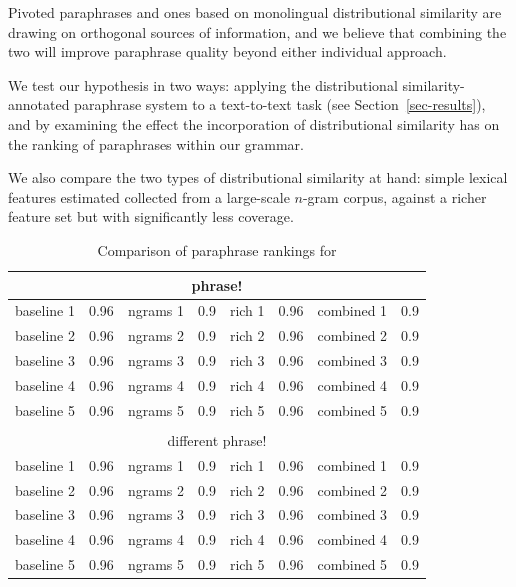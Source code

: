 \documentclass[11pt]{article}
\begin{document}
Pivoted paraphrases and ones based on monolingual distributional
similarity are drawing on orthogonal sources of information, and we
believe that combining the two will improve paraphrase quality beyond
either individual approach.

We test our hypothesis in two ways: applying the distributional
similarity-annotated paraphrase system to a text-to-text task (see
Section~\ref{sec-results}), and by examining the effect the
incorporation of distributional similarity has on the ranking of
paraphrases within our grammar.

We also compare the two types of distributional similarity at hand:
simple lexical features estimated collected from a large-scale
$n$-gram corpus, against a richer feature set but with significantly
less coverage.

\begin{table}[t]
\small
\begin{center}
\begin{tabular}{|cl|cl|cl|cl|}
  \hline
  \multicolumn{8}{|c|}{phrase!} \\
  \hline
  baseline 1 & 0.96 &
  ngrams 1 & 0.9 &
  rich 1 & 0.96 &
  combined 1 & 0.9 \\

  baseline 2 & 0.96 &
  ngrams 2 & 0.9 &
  rich 2 & 0.96 &
  combined 2 & 0.9 \\

  baseline 3 & 0.96 &
  ngrams 3 & 0.9 &
  rich 3 & 0.96 &
  combined 3 & 0.9 \\


  baseline 4 & 0.96 &
  ngrams 4 & 0.9 &
  rich 4 & 0.96 &
  combined 4 & 0.9 \\


  baseline 5 & 0.96 &
  ngrams 5 & 0.9 &
  rich 5 & 0.96 &
  combined 5 & 0.9 \\

  \hline
  \multicolumn{8}{c}{} \\
  \hline
  \multicolumn{8}{|c|}{different phrase!} \\
  \hline
  baseline 1 & 0.96 &
  ngrams 1 & 0.9 &
  rich 1 & 0.96 &
  combined 1 & 0.9 \\

  baseline 2 & 0.96 &
  ngrams 2 & 0.9 &
  rich 2 & 0.96 &
  combined 2 & 0.9 \\

  baseline 3 & 0.96 &
  ngrams 3 & 0.9 &
  rich 3 & 0.96 &
  combined 3 & 0.9 \\


  baseline 4 & 0.96 &
  ngrams 4 & 0.9 &
  rich 4 & 0.96 &
  combined 4 & 0.9 \\


  baseline 5 & 0.96 &
  ngrams 5 & 0.9 &
  rich 5 & 0.96 &
  combined 5 & 0.9 \\

  \hline
\end{tabular}
\end{center}
\normalsize
\caption{Comparison of paraphrase rankings for }
\label{grammar_stats}
\end{table}
\end{document}
